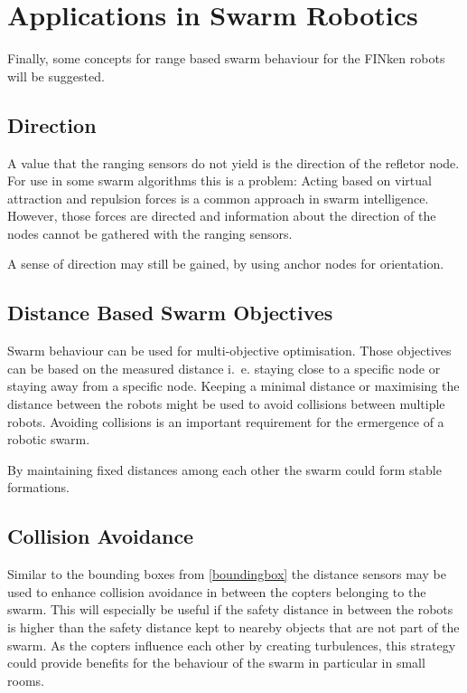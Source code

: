 \section{Applications in Swarm Robotics}

Finally, some concepts for range based swarm behaviour for the FINken robots will be suggested.

\subsection{Direction}
A value that the ranging sensors do not yield is the direction of the refletor node.
For use in some swarm algorithms this is a problem: Acting based on virtual attraction and repulsion forces is a common approach in swarm intelligence.
However, those forces are directed and information about the direction of the nodes cannot be gathered with the ranging sensors.

A sense of direction may still be gained, by using anchor nodes for orientation.

\subsection{Distance Based Swarm Objectives}
Swarm behaviour can be used for multi-objective optimisation.
Those objectives can be based on the measured distance i.~e. staying close to a specific node or staying away from a specific node.
Keeping a minimal distance or maximising the distance between the robots might be used to avoid collisions between multiple robots.
Avoiding collisions is an important requirement for the ermergence of a robotic swarm.

By maintaining fixed distances among each other the swarm could form stable formations.

\subsection{Collision Avoidance}
Similar to the bounding boxes from \autoref{boundingbox} the distance sensors may be used to enhance collision avoidance in between the copters belonging to the swarm.
This will especially be useful if the safety distance in between the robots is higher than the safety distance kept to neareby objects that are not part of the swarm.
As the copters influence each other by creating turbulences, this strategy could provide benefits for the behaviour of the swarm in particular in small rooms.


